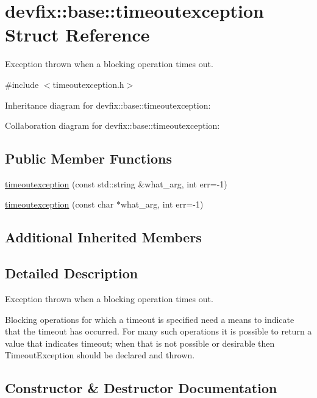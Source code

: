 \hypertarget{structdevfix_1_1base_1_1timeoutexception}{}\section{devfix\+:\+:base\+:\+:timeoutexception Struct Reference}
\label{structdevfix_1_1base_1_1timeoutexception}


Exception thrown when a blocking operation times out.  




{\ttfamily \#include $<$timeoutexception.\+h$>$}



Inheritance diagram for devfix\+:\+:base\+:\+:timeoutexception\+:


Collaboration diagram for devfix\+:\+:base\+:\+:timeoutexception\+:
\subsection*{Public Member Functions}
\begin{DoxyCompactItemize}
\item 
\hyperlink{structdevfix_1_1base_1_1timeoutexception_ad900adf164c04e3a33dafd38ded1f024}{timeoutexception} (const std\+::string \&what\+\_\+arg, int err=-\/1)
\item 
\hyperlink{structdevfix_1_1base_1_1timeoutexception_a684cb2e6e0d78b98d30c505a6bf9066d}{timeoutexception} (const char $\ast$what\+\_\+arg, int err=-\/1)
\end{DoxyCompactItemize}
\subsection*{Additional Inherited Members}


\subsection{Detailed Description}
Exception thrown when a blocking operation times out. 

Blocking operations for which a timeout is specified need a means to indicate that the timeout has occurred. For many such operations it is possible to return a value that indicates timeout; when that is not possible or desirable then Timeout\+Exception should be declared and thrown. 

\subsection{Constructor \& Destructor Documentation}
\mbox{\label{structdevfix_1_1base_1_1timeoutexception_ad900adf164c04e3a33dafd38ded1f024}} 
